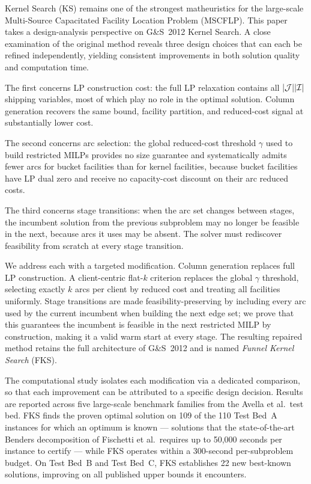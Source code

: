 Kernel Search (KS) remains one of the strongest matheuristics for the
large-scale Multi-Source Capacitated Facility Location Problem (MSCFLP).
This paper takes a design-analysis perspective on G\&S~2012 Kernel Search.
A close examination of the original method reveals three design choices that
can each be refined independently, yielding consistent improvements in both
solution quality and computation time.

The first concerns LP construction cost: the full LP relaxation contains all
$|\mathcal{J}||\mathcal{I}|$ shipping variables, most of which play no role in the optimal
solution.
Column generation recovers the same bound, facility partition, and
reduced-cost signal at substantially lower cost.

The second concerns arc selection: the global reduced-cost threshold $\gamma$
used to build restricted MILPs provides no size guarantee and systematically
admits fewer arcs for bucket facilities than for kernel facilities, because
bucket facilities have LP dual zero and receive no capacity-cost discount on
their arc reduced costs.

The third concerns stage transitions: when the arc set changes between stages,
the incumbent solution from the previous subproblem may no longer be feasible
in the next, because arcs it uses may be absent.
The solver must rediscover feasibility from scratch at every stage transition.

We address each with a targeted modification.
Column generation replaces full LP construction.
A client-centric flat-$k$ criterion replaces the global $\gamma$ threshold,
selecting exactly $k$ arcs per client by reduced cost and treating all
facilities uniformly.
Stage transitions are made feasibility-preserving by including every arc used
by the current incumbent when building the next edge set; we prove that this
guarantees the incumbent is feasible in the next restricted MILP by
construction, making it a valid warm start at every stage.
The resulting repaired method retains the full architecture of G\&S~2012 and
is named \emph{Funnel Kernel Search} (FKS).

The computational study isolates each modification via a dedicated comparison,
so that each improvement can be attributed to a specific design decision.
Results are reported across five large-scale benchmark families from the
Avella et al.\ test bed.
FKS finds the proven optimal solution on 109 of the 110 Test Bed~A instances
for which an optimum is known --- solutions that the state-of-the-art Benders
decomposition of Fischetti et al.\ requires up to 50{,}000 seconds per instance
to certify --- while FKS operates within a 300-second per-subproblem budget.
On Test Bed~B and Test Bed~C, FKS establishes 22 new best-known solutions,
improving on all published upper bounds it encounters.
